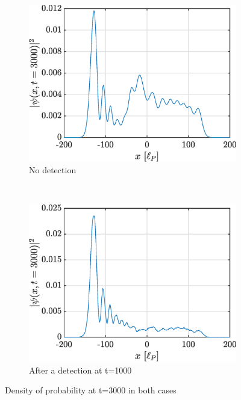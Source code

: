 \documentclass[a4paper,12pt,twoside]{article}
\begin{document}
\begin{figure}[h]
        \centering
        \begin{subfigure}[t]{0.45\textwidth}
          \includegraphics[width=\textwidth]{graphs/iv_neg_3000.eps}
          \caption{No detection}
          \label{fig:iv_neg_3000}
        \end{subfigure}
        ~
        \begin{subfigure}[t]{0.45\textwidth}
          \includegraphics[width=\textwidth]{graphs/iv_det_3000.eps}
          \caption{After a detection at t=1000}
          \label{fig:iv_det_3000}
        \end{subfigure}
        \caption{Density of probability at t=3000 in both cases}
        \label{fig:iv_3000}
\end{figure}
\end{document}
